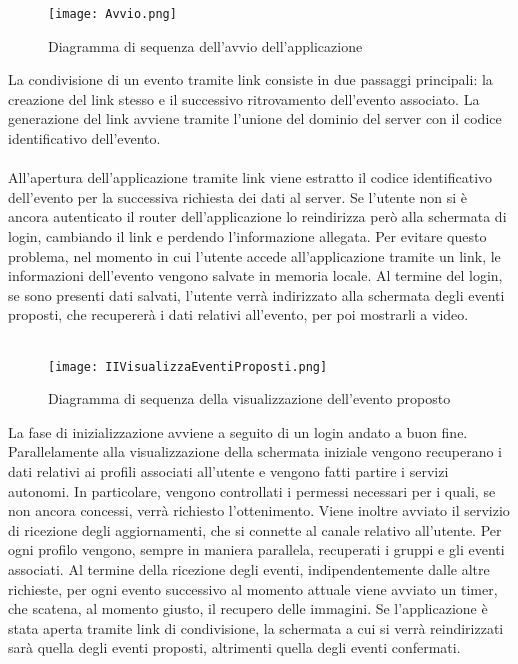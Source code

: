 \begin{figure}[h!]
    \begin{center}
        \texttt{[image: Avvio.png]}
        \caption{Diagramma di sequenza dell'avvio dell'applicazione}
    \end{center}
\end{figure}

La condivisione di un evento tramite link
consiste in due passaggi principali:
la creazione del link stesso e il successivo ritrovamento dell'evento associato.
La generazione del link avviene tramite
l'unione del dominio del server con il codice identificativo dell'evento.\\
\\
All'apertura dell'applicazione tramite link
viene estratto il codice identificativo dell'evento
per la successiva richiesta dei dati al server.
Se l'utente non si è ancora autenticato
il router dell'applicazione lo reindirizza però alla schermata di login,
cambiando il link e perdendo l'informazione allegata.
Per evitare questo problema,
nel momento in cui l'utente accede all'applicazione tramite un link,
le informazioni dell'evento vengono salvate in memoria locale.
Al termine del login, se sono presenti dati salvati,
l'utente verrà indirizzato alla schermata degli eventi proposti,
che recupererà i dati relativi all'evento, per poi mostrarli a video.\\
\\

\begin{figure}[h!]
    \begin{center}
        \texttt{[image: IIVisualizzaEventiProposti.png]}
        \caption{Diagramma di sequenza della visualizzazione dell'evento proposto}
    \end{center}
\end{figure}

\clearpage

La fase di inizializzazione avviene a seguito di un login andato a buon fine.
Parallelamente alla visualizzazione della schermata iniziale
vengono recuperano i dati relativi ai profili associati all'utente
e vengono fatti partire i servizi autonomi.
In particolare, 
vengono controllati i permessi necessari per i quali,
se non ancora concessi, verrà richiesto l'ottenimento.
Viene inoltre avviato il servizio di ricezione degli aggiornamenti,
che si connette al canale relativo all'utente.
Per ogni profilo vengono, sempre in maniera parallela, 
recuperati i gruppi e gli eventi associati.
Al termine della ricezione degli eventi, 
indipendentemente dalle altre richieste,
per ogni evento successivo al momento attuale viene avviato un timer, 
che scatena, al momento giusto, il recupero delle immagini.
Se l'applicazione è stata aperta tramite link di condivisione,
la schermata a cui si verrà reindirizzati sarà quella degli eventi proposti,
altrimenti quella degli eventi confermati.\\
\\

